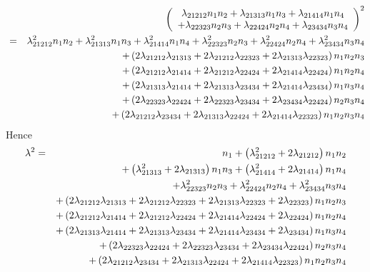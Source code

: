 \documentclass[12pt]{article}
\begin{document}
\begin{eqnarray}
&&\left( 
\begin{array}{c}
\lambda _{21212}n_{1}n_{2}+\lambda _{21313}n_{1}n_{3}+\lambda
_{21414}n_{1}n_{4} \\ 
+\lambda _{22323}n_{2}n_{3}+\lambda _{22424}n_{2}n_{4}+\lambda
_{23434}n_{3}n_{4}%
\end{array}%
\right) ^{2}  \notag \\
&=&\lambda _{21212}^{2}n_{1}n_{2}+\lambda _{21313}^{2}n_{1}n_{3}+\lambda
_{21414}^{2}n_{1}n_{4}+\lambda _{22323}^{2}n_{2}n_{3}+\lambda
_{22424}^{2}n_{2}n_{4}+\lambda _{23434}^{2}n_{3}n_{4}  \notag \\
&&+\left( 2\lambda _{21212}\lambda _{21313}+2\lambda _{21212}\lambda
_{22323}+2\lambda _{21313}\lambda _{22323}\right) n_{1}n_{2}n_{3}  \notag \\
&&+\left( 2\lambda _{21212}\lambda _{21414}+2\lambda _{21212}\lambda
_{22424}+2\lambda _{21414}\lambda _{22424}\right) n_{1}n_{2}n_{4}  \notag \\
&&+\left( 2\lambda _{21313}\lambda _{21414}+2\lambda _{21313}\lambda
_{23434}+2\lambda _{21414}\lambda _{23434}\right) n_{1}n_{3}n_{4}  \notag \\
&&+\left( 2\lambda _{22323}\lambda _{22424}+2\lambda _{22323}\lambda
_{23434}+2\lambda _{23434}\lambda _{22424}\right) n_{2}n_{3}n_{4}  \notag \\
&&+\left( 2\lambda _{21212}\lambda _{23434}+2\lambda _{21313}\lambda
_{22424}+2\lambda _{21414}\lambda _{22323}\right) n_{1}n_{2}n_{3}n_{4}
\end{eqnarray}%
Hence%
\begin{eqnarray}
\lambda ^{2} &=&n_{1}+\left( \lambda _{21212}^{2}+2\lambda _{21212}\right)
n_{1}n_{2}  \notag \\
&&+\left( \lambda _{21313}^{2}+2\lambda _{21313}\right) n_{1}n_{3}+\left(
\lambda _{21414}^{2}+2\lambda _{21414}\right) n_{1}n_{4}  \notag \\
&&+\lambda _{22323}^{2}n_{2}n_{3}+\lambda _{22424}^{2}n_{2}n_{4}+\lambda
_{23434}^{2}n_{3}n_{4}  \notag \\
&&+\left( 2\lambda _{21212}\lambda _{21313}+2\lambda _{21212}\lambda
_{22323}+2\lambda _{21313}\lambda _{22323}+2\lambda _{22323}\right)
n_{1}n_{2}n_{3}  \notag \\
&&+\left( 2\lambda _{21212}\lambda _{21414}+2\lambda _{21212}\lambda
_{22424}+2\lambda _{21414}\lambda _{22424}+2\lambda _{22424}\right)
n_{1}n_{2}n_{4}  \notag \\
&&+\left( 2\lambda _{21313}\lambda _{21414}+2\lambda _{21313}\lambda
_{23434}+2\lambda _{21414}\lambda _{23434}+2\lambda _{23434}\right)
n_{1}n_{3}n_{4}  \notag \\
&&+\left( 2\lambda _{22323}\lambda _{22424}+2\lambda _{22323}\lambda
_{23434}+2\lambda _{23434}\lambda _{22424}\right) n_{2}n_{3}n_{4}  \notag \\
&&+\left( 2\lambda _{21212}\lambda _{23434}+2\lambda _{21313}\lambda
_{22424}+2\lambda _{21414}\lambda _{22323}\right) n_{1}n_{2}n_{3}n_{4}
\end{eqnarray}%
\end{document}
